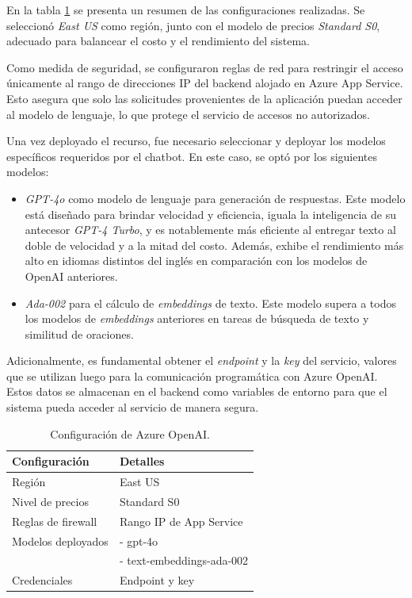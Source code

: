 En la tabla \ref{tab:config-openai} se presenta un resumen de las configuraciones realizadas. 
Se seleccionó \textit{East US} como región, junto con el modelo de precios \textit{Standard S0}, 
adecuado para balancear el costo y el rendimiento del sistema.

Como medida de seguridad, se configuraron reglas de red para restringir el acceso únicamente al rango 
de direcciones IP del backend alojado en Azure App Service. Esto asegura que solo las solicitudes provenientes de la 
aplicación puedan acceder al modelo de lenguaje, lo que protege el servicio de accesos no autorizados.

Una vez deployado el recurso, fue necesario seleccionar y deployar los modelos específicos requeridos por el chatbot. 
En este caso, se optó por los siguientes modelos:

\begin{itemize}
	\item \textit{GPT-4o} como modelo de lenguaje para generación de respuestas. Este modelo está diseñado para brindar velocidad 
  y eficiencia, iguala la inteligencia de su antecesor \textit{GPT-4 Turbo}, y es notablemente más eficiente al entregar texto al 
  doble de velocidad y a la mitad del costo. Además, exhibe el rendimiento más alto en idiomas distintos del inglés en comparación 
  con los modelos de OpenAI anteriores.
	\item \textit{Ada-002} para el cálculo de \textit{embeddings} de texto. Este modelo supera a todos los modelos de \textit{embeddings} 
  anteriores en tareas de búsqueda de texto y similitud de oraciones.
\end{itemize}

Adicionalmente, es fundamental obtener el \textit{endpoint} y la \textit{key} del servicio, valores que se utilizan luego para la comunicación programática 
con Azure OpenAI. Estos datos se almacenan en el backend como variables de entorno para que el sistema pueda acceder al servicio de manera segura.

\begin{table}[h]
	\centering
	\caption[Configuración de Azure OpenAI]{Configuración de Azure OpenAI.}
	\begin{tabular}{l l}    
		\toprule
		\textbf{Configuración} 	 & \textbf{Detalles} 	     \\
		\midrule
		Región                   &	East US 				 \\		
		Nivel de precios         & Standard S0				 \\
		Reglas de firewall       & Rango IP de App Service   \\
        Modelos deployados	     & - gpt-4o				     \\
            	                 & - text-embeddings-ada-002 \\
        Credenciales	         & Endpoint y key 		     \\
		\bottomrule
		\hline
	\end{tabular}
	\label{tab:config-openai}
\end{table}

